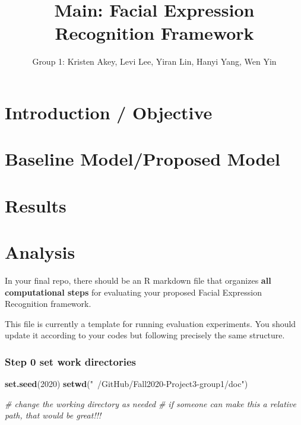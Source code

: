 \documentclass[
]{article}
\title{Main: Facial Expression Recognition Framework}
\author{Group 1: Kristen Akey, Levi Lee, Yiran Lin, Hanyi Yang, Wen Yin}
\date{}
\newenvironment{Shaded}{\begin{snugshade}}{\end{snugshade}}
\newcommand{\CommentTok}[1]{\textcolor[rgb]{0.56,0.35,0.01}{\textit{#1}}}
\newcommand{\DecValTok}[1]{\textcolor[rgb]{0.00,0.00,0.81}{#1}}
\newcommand{\KeywordTok}[1]{\textcolor[rgb]{0.13,0.29,0.53}{\textbf{#1}}}
\newcommand{\NormalTok}[1]{#1}
\newcommand{\StringTok}[1]{\textcolor[rgb]{0.31,0.60,0.02}{#1}}
\begin{document}
\maketitle

\hypertarget{introduction-objective}{%
\section{Introduction / Objective}\label{introduction-objective}}

\hypertarget{baseline-modelproposed-model}{%
\section{Baseline Model/Proposed
Model}\label{baseline-modelproposed-model}}

\hypertarget{results}{%
\section{Results}\label{results}}

\hypertarget{analysis}{%
\section{Analysis}\label{analysis}}

In your final repo, there should be an R markdown file that organizes
\textbf{all computational steps} for evaluating your proposed Facial
Expression Recognition framework.

This file is currently a template for running evaluation experiments.
You should update it according to your codes but following precisely the
same structure.

\hypertarget{step-0-set-work-directories}{%
\subsubsection{Step 0 set work
directories}\label{step-0-set-work-directories}}

\begin{Shaded}
\begin{Highlighting}[]
\KeywordTok{set.seed}\NormalTok{(}\DecValTok{2020}\NormalTok{)}
\KeywordTok{setwd}\NormalTok{(}\StringTok{"~/GitHub/Fall2020-Project3-group1/doc"}\NormalTok{)}


\CommentTok{# change the working directory as needed}
\CommentTok{# if someone can make this a relative path, that would be great!!! }
\end{Highlighting}
\end{Shaded}
\end{document}
